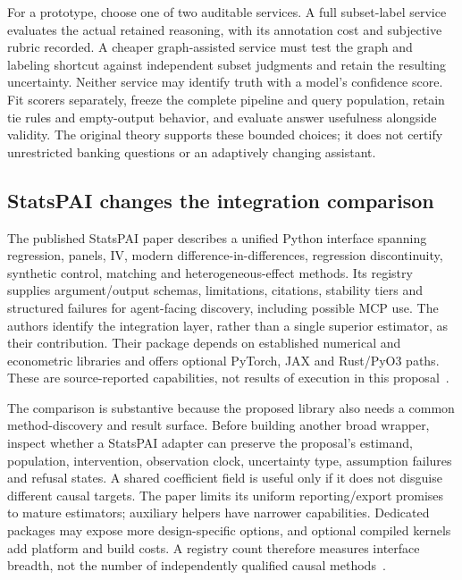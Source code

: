 For a prototype, choose one of two auditable services. A full subset-label
service evaluates the actual retained reasoning, with its annotation cost
and subjective rubric recorded. A cheaper graph-assisted service must test
the graph and labeling shortcut against independent subset judgments and
retain the resulting uncertainty. Neither service may identify truth with
a model's confidence score. Fit scorers separately, freeze the complete
pipeline and query population, retain tie rules and empty-output behavior,
and evaluate answer usefulness alongside validity. The original theory
supports these bounded choices; it does not certify unrestricted banking
questions or an adaptively changing assistant.

\subsection{StatsPAI changes the integration comparison}
\label{exec23:proof-statspai}
The published StatsPAI paper describes a unified Python interface spanning
regression, panels, IV, modern difference-in-differences, regression
discontinuity, synthetic control, matching and heterogeneous-effect methods.
Its registry supplies argument/output schemas, limitations, citations,
stability tiers and structured failures for agent-facing discovery, including
possible MCP use. The authors identify the integration layer, rather than a
single superior estimator, as their contribution. Their package depends on
established numerical and econometric libraries and offers optional PyTorch,
JAX and Rust/PyO3 paths. These are source-reported capabilities, not results
of execution in this proposal~\citep{exec23_statspai_paper}.

The comparison is substantive because the proposed library also needs a
common method-discovery and result surface. Before building another broad
wrapper, inspect whether a StatsPAI adapter can preserve the proposal's
estimand, population, intervention, observation clock, uncertainty type,
assumption failures and refusal states. A shared coefficient field is useful
only if it does not disguise different causal targets. The paper limits its
uniform reporting/export promises to mature estimators; auxiliary helpers
have narrower capabilities. Dedicated packages may expose more design-specific
options, and optional compiled kernels add platform and build costs. A
registry count therefore measures interface breadth, not the number of
independently qualified causal methods~\citep{exec23_statspai_paper}.

